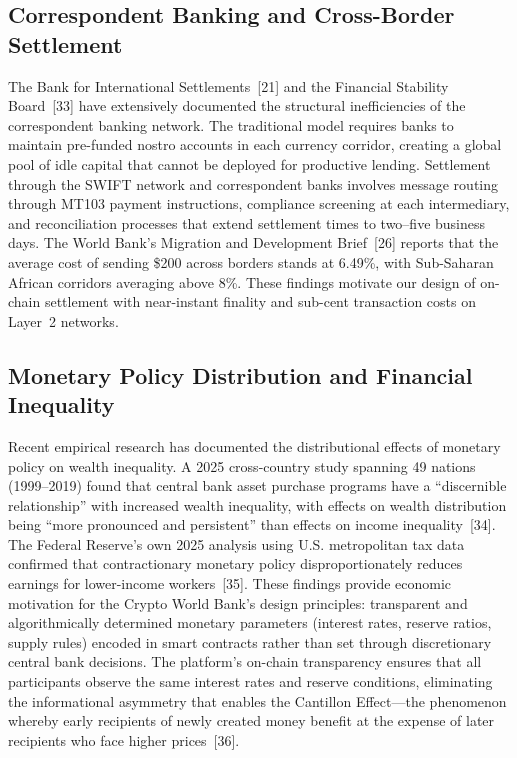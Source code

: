 \documentclass[12pt,a4paper]{report}
\begin{document}
\subsection{Correspondent Banking and Cross-Border Settlement}

The Bank for International Settlements~[21] and the Financial Stability Board~[33] have extensively documented the structural inefficiencies of the correspondent banking network. The traditional model requires banks to maintain pre-funded nostro accounts in each currency corridor, creating a global pool of idle capital that cannot be deployed for productive lending. Settlement through the SWIFT network and correspondent banks involves message routing through MT103 payment instructions, compliance screening at each intermediary, and reconciliation processes that extend settlement times to two--five business days. The World Bank's Migration and Development Brief~[26] reports that the average cost of sending \$200 across borders stands at 6.49\%, with Sub-Saharan African corridors averaging above 8\%. These findings motivate our design of on-chain settlement with near-instant finality and sub-cent transaction costs on Layer~2 networks.

\subsection{Monetary Policy Distribution and Financial Inequality}

Recent empirical research has documented the distributional effects of monetary policy on wealth inequality. A 2025 cross-country study spanning 49 nations (1999--2019) found that central bank asset purchase programs have a ``discernible relationship'' with increased wealth inequality, with effects on wealth distribution being ``more pronounced and persistent'' than effects on income inequality~[34]. The Federal Reserve's own 2025 analysis using U.S. metropolitan tax data confirmed that contractionary monetary policy disproportionately reduces earnings for lower-income workers~[35]. These findings provide economic motivation for the Crypto World Bank's design principles: transparent and algorithmically determined monetary parameters (interest rates, reserve ratios, supply rules) encoded in smart contracts rather than set through discretionary central bank decisions. The platform's on-chain transparency ensures that all participants observe the same interest rates and reserve conditions, eliminating the informational asymmetry that enables the Cantillon Effect---the phenomenon whereby early recipients of newly created money benefit at the expense of later recipients who face higher prices~[36].
\end{document}
